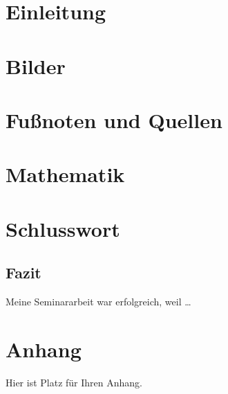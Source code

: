 \documentclass{article}
\begin{document}
    \setupSeminararbeit{}
    


    \section{Einleitung}
    
    \newpage

    \section{Bilder}
    
    \newpage



    \section{Fußnoten und Quellen}
    
    \newpage



    \section{Mathematik}
    



    
    

    
    \newpage

    \section{Schlusswort}
    \subsection{Fazit}
    Meine Seminararbeit war erfolgreich, weil \dots
    \newpage


    \insertOfficialDocs{}


    \section{Anhang}
    Hier ist Platz für Ihren Anhang.
\end{document}
